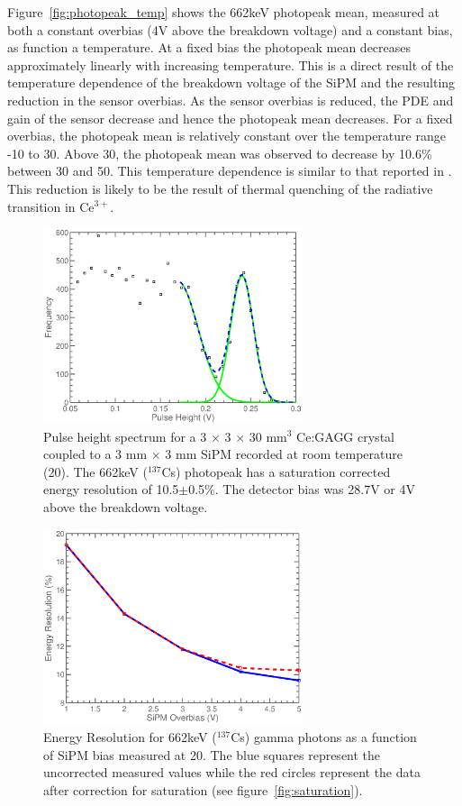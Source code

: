 \documentclass[journal]{IEEEtran}
\begin{document}
Figure~\ref{fig:photopeak_temp} shows the 662keV photopeak mean, measured at both a constant overbias (4V above the breakdown voltage) and a constant bias, as function a temperature. At a fixed bias the photopeak mean decreases approximately linearly with increasing temperature. This is a direct result of the temperature dependence of the breakdown voltage of the SiPM and the resulting reduction in the sensor overbias. As the sensor overbias is reduced, the PDE and gain of the sensor decrease and hence the photopeak mean decreases. For a fixed overbias, the photopeak mean is relatively constant over the temperature range -10\celsius{} to 30\celsius{}. Above 30\celsius{}, the photopeak mean was observed to decrease by 10.6\% between 30\celsius{} and 50\celsius{}. This temperature dependence is similar to that reported in \cite{temp:yan}. This reduction is likely to be the result of thermal quenching of the radiative transition in Ce$^{3+}$. 

\begin{figure}[t]
\centering
\includegraphics[width=3in]{energy_resolution.eps}
\caption{Pulse height spectrum for a 3 $\times$ 3 $\times$ 30 mm$^{3}$ Ce:GAGG crystal coupled to a 3 mm $\times$ 3 mm SiPM recorded at room temperature (20\celsius{}). The 662keV ($^{137}$Cs) photopeak has a saturation corrected energy resolution of 10.5$\pm$0.5\%. The detector bias was 28.7V or 4V above the breakdown voltage.}
\label{fig:er}
\end{figure}

\begin{figure}[tb]
\centering
\includegraphics[width=3in]{er_obias.eps}
\caption{Energy Resolution for 662keV ($^{\text{137}}$Cs) gamma photons as a function of SiPM bias measured at 20\celsius{}. The blue squares represent the uncorrected measured values while the red circles represent the data after correction for saturation (see figure~\ref{fig:saturation}).}
\label{fig:erbias}
\end{figure}
\end{document}
